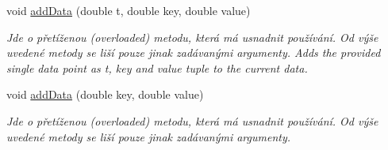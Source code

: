 \begin{DoxyCompactItemize}
void \hyperlink{classQCPCurve_a13398b236f6926014e404eeb5b9f415c}{add\+Data} (double t, double key, double value)
\begin{DoxyCompactList}\small\item\em Jde o přetíženou (overloaded) metodu, která má usnadnit používání. Od výše uvedené metody se liší pouze jinak zadávanými argumenty. Adds the provided single data point as {\itshape t}, {\itshape key} and {\itshape value} tuple to the current data. \end{DoxyCompactList}\item 
void \hyperlink{classQCPCurve_ada4762e793cd5707b33f35b8a4b0f8fb}{add\+Data} (double key, double value)
\begin{DoxyCompactList}\small\item\em Jde o přetíženou (overloaded) metodu, která má usnadnit používání. Od výše uvedené metody se liší pouze jinak zadávanými argumenty.


\end{DoxyCompactList}
\end{DoxyCompactItemize}
